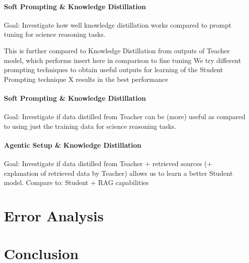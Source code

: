 \documentclass{article}
\begin{document}
\paragraph{Soft Prompting \& Knowledge Distillation}
Goal: Investigate how well knowledge distillation works compared to prompt tuning for science reasoning tasks.


This is further compared to Knowledge Distillation from outputs of Teacher model, which performs {insert here} in comparison to fine tuning
We try different prompting techniques to obtain useful outputs for learning of the Student
Prompting technique {X} results in the best performance

\paragraph{Soft Prompting \& Knowledge Distillation}
Goal: Investigate if data distilled from Teacher can be (more) useful as compared to using just the training data for science reasoning tasks.
\paragraph{Agentic Setup \& Knowledge Distillation}
Goal: Investigate if data distilled from Teacher + retrieved sources (+ explanation of retrieved data by Teacher) allows us to learn a better Student model. Compare to: Student + RAG capabilities

\label{knowledge-distillation}

\section{Error Analysis}
\label{error-analysis}

\section{Conclusion}
\label{Conclusion}



\end{document}
